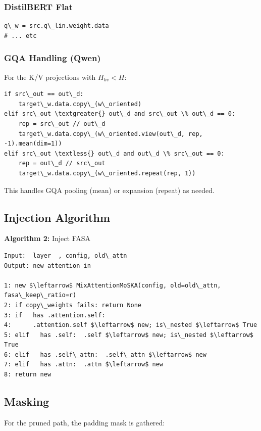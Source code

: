 \subsubsection{DistilBERT Flat}

\begin{lstlisting}
q\_w = src.q\_lin.weight.data
# ... etc
\end{lstlisting}

\subsubsection{GQA Handling (Qwen)}

For the K/V projections with $H_{kv} < H$:

\begin{lstlisting}
if src\_out == out\_d:
    target\_w.data.copy\_(w\_oriented)
elif src\_out \textgreater{} out\_d and src\_out \% out\_d == 0:
    rep = src\_out // out\_d
    target\_w.data.copy\_(w\_oriented.view(out\_d, rep, -1).mean(dim=1))
elif src\_out \textless{} out\_d and out\_d \% src\_out == 0:
    rep = out\_d // src\_out
    target\_w.data.copy\_(w\_oriented.repeat(rep, 1))
\end{lstlisting}

This handles GQA pooling (mean) or expansion (repeat) as needed.

\subsection{Injection Algorithm}

\textbf{Algorithm 2:} Inject FASA
\begin{lstlisting}
Input:  layer  , config, old\_attn
Output: new attention in  

1: new $\leftarrow$ MixAttentionMoSKA(config, old=old\_attn, fasa\_keep\_ratio=r)
2: if copy\_weights fails: return None
3: if   has .attention.self:
4:      .attention.self $\leftarrow$ new; is\_nested $\leftarrow$ True
5: elif   has .self:  .self $\leftarrow$ new; is\_nested $\leftarrow$ True
6: elif   has .self\_attn:  .self\_attn $\leftarrow$ new
7: elif   has .attn:  .attn $\leftarrow$ new
8: return new
\end{lstlisting}

\subsection{Masking}

For the pruned path, the padding mask is gathered:

